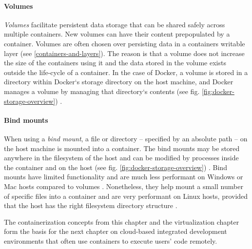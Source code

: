 \paragraph{Volumes}
\emph{Volumes} facilitate persistent data storage that can be shared safely across multiple containers. New volumes can have their content prepopulated by a container. Volumes are often chosen over persisting data in a containers writable layer (see \ref{containers-and-layers}). The reason is that a volume does not increase the size of the containers using it and the data stored in the volume exists outside the life-cycle of a container. In the case of Docker, a volume is stored in a directory within Docker`s storage directory on the host machine, and Docker manages a volume by managing that directory`s contents (see fig. \ref{fig:docker-storage-overview}) \cite{DockerVolumes}\cite{DockerBindMounts}. 
\paragraph{Bind mounts}
When using a \emph{bind mount}, a file or directory -- specified by an absolute path -- on the host machine is mounted into a container. The bind mounts may be stored anywhere in the filesystem of the host and can be modified by processes inside the container and on the host (see fig. \ref{fig:docker-storage-overview}) \cite{DockerStorage}. Bind mounts have limited functionality and are much less performant on Windows or Mac hosts compared to volumes \cite{DockerBindMounts}\cite{DockerVolumes}. Nonetheless, they help mount a small number of specific files into a container and are very performant on Linux hosts, provided that the host has the right filesystem directory structure \cite{DockerBindMounts}.

The containerization concepts from this chapter and the virtualization chapter form the basis for the next chapter on cloud-based integrated development environments that often use containers to execute users' code remotely.


